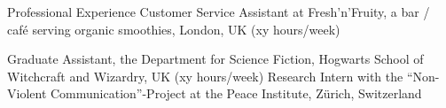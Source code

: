 \begin{rubric}{Professional Experience} %
Customer Service Assistant at Fresh'n'Fruity, a bar / caf\'e{} serving organic smoothies, London, UK (xy hours/week)

Graduate Assistant, the Department for Science Fiction, Hogwarts School of Witchcraft and Wizardry, UK (xy hours/week) 
\entry*[MM/YY --- MM/YY]
Research Intern with the ``Non-Violent Communication''-Project at the Peace Institute, Z\"urich, Switzerland
\end{rubric}